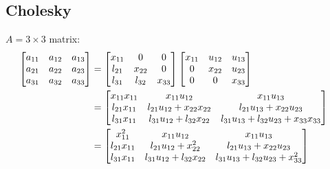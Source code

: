 	\subsection{Cholesky}

		$A = 3 \times 3$ matrix:
		\begin{align}
			\begin{bmatrix}
				a_{11} & a_{12} & a_{13} \\
				a_{21} & a_{22} & a_{23} \\
				a_{31} & a_{32} & a_{33}
			\end{bmatrix} &=
			\begin{bmatrix}
				x_{11} & 0 & 0 \\
				l_{21} & x_{22} & 0 \\
				l_{31} & l_{32} & x_{33}
			\end{bmatrix}
			\begin{bmatrix}
				x_{11} & u_{12} & u_{13} \\
				0 & x_{22} & u_{23} \\
				0 & 0 & x_{33}
			\end{bmatrix}
			& \\ &=
			\begin{bmatrix}
				x_{11} x_{11} & x_{11} u_{12} & x_{11} u_{13} \\
				l_{21} x_{11} & l_{21} u_{12} + x_{22} x_{22}
					& l_{21} u_{13} + x_{22} u_{23} \\
				l_{31} x_{11} & l_{31} u_{12} + l_{32} x_{22}
					& l_{31} u_{13} + l_{32} u_{23} + x_{33} x_{33}
			\end{bmatrix}
			& \notag \\ &=
			\begin{bmatrix}
				x_{11}^{2} & x_{11} u_{12} & x_{11} u_{13} \\
				l_{21} x_{11} & l_{21} u_{12} + x_{22}^{2}
					& l_{21} u_{13} + x_{22} u_{23} \\
				l_{31} x_{11} & l_{31} u_{12} + l_{32} x_{22}
					& l_{31} u_{13} + l_{32} u_{23} + x_{33}^{2}
			\end{bmatrix}&
		\end{align}
